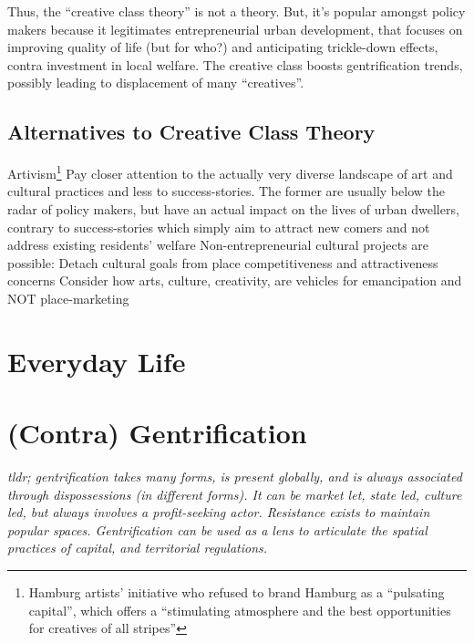 \documentclass{article}
\begin{document}
Thus, the ``creative class theory'' is not a theory. But, it's popular amongst policy makers because it legitimates entrepreneurial urban development, that focuses on improving quality of life (but for who?) and anticipating trickle-down effects, contra investment in local welfare. The creative class boosts gentrification trends, possibly leading to displacement of many ``creatives''.

\subsection{Alternatives to Creative Class Theory}

\begin{outline}
	\1 Artivism\footnote{Hamburg artists' initiative who refused to brand Hamburg as a ``pulsating capital'', which offers a ``stimulating atmosphere and the best opportunities for creatives of all stripes''}
	\1 Pay closer attention to the actually very diverse landscape of art and cultural practices and less to success-stories. The former are usually below the radar of policy makers, but have an actual impact on the lives of urban dwellers, contrary to success-stories which simply aim to attract new comers and not address existing residents' welfare
	\1 Non-entrepreneurial cultural projects are possible:
		\2 Detach cultural goals from place competitiveness and attractiveness concerns
		\2 Consider how arts, culture, creativity, are vehicles for emancipation and NOT place-marketing 
\end{outline}



\section{Everyday Life}

\section{(Contra) Gentrification}

\textit{tldr; gentrification takes many forms, is present globally, and is always associated through dispossessions (in different forms). It can be market let, state led, culture led, but always involves a profit-seeking actor. Resistance exists to maintain popular spaces.
Gentrification can be used as a lens to articulate the spatial practices of capital, and territorial regulations.}
\end{document}

